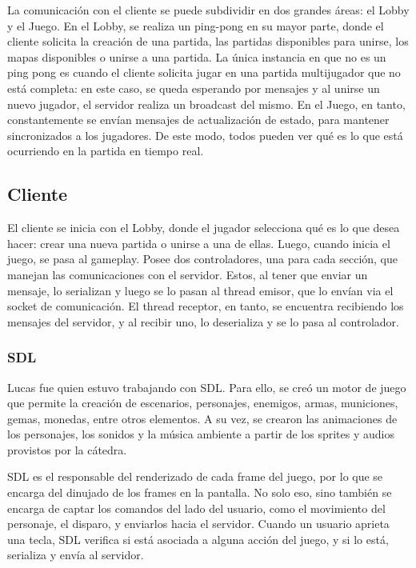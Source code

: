 \documentclass[titlepage,a4paper]{article}
\begin{document}
La comunicación con el cliente se puede subdividir en dos grandes áreas: el Lobby y el Juego. En el Lobby, se realiza un ping-pong en su mayor parte, donde el cliente solicita la creación de una partida, las partidas disponibles para unirse, los mapas disponibles o unirse a una partida. La única instancia en que no es un ping pong es cuando el cliente solicita jugar en una partida multijugador que no está completa: en este caso, se queda esperando por mensajes y al unirse un nuevo jugador, el servidor realiza un broadcast del mismo. En el Juego, en tanto, constantemente se envían mensajes de actualización de estado, para mantener sincronizados a los jugadores. De este modo, todos pueden ver qué es lo que está ocurriendo en la partida en tiempo real.

\subsection{Cliente}
El cliente se inicia con el Lobby, donde el jugador selecciona qué es lo que desea hacer: crear una nueva partida o unirse a una de ellas. Luego, cuando inicia el juego, se pasa al gameplay. Posee dos controladores, una para cada sección, que manejan las comunicaciones con el servidor. Estos, al tener que enviar un mensaje, lo serializan y luego se lo pasan al thread emisor, que lo envían via el socket de comunicación. El thread receptor, en tanto, se encuentra recibiendo los mensajes del servidor, y al recibir uno, lo deserializa y se lo pasa al controlador.

\subsubsection{SDL}
Lucas fue quien estuvo trabajando con SDL. Para ello, se creó un motor de juego que permite la creación de escenarios, personajes, enemigos, armas, municiones, gemas, monedas, entre otros elementos. A su vez, se crearon las animaciones de los personajes, los sonidos y la música ambiente a partir de los sprites y audios provistos por la cátedra. 

SDL es el responsable del renderizado de cada frame del juego, por lo que se encarga del dinujado de los frames en la pantalla. No solo eso, sino también se encarga de captar los comandos del lado del usuario, como el movimiento del personaje, el disparo, y enviarlos hacia el servidor. Cuando un usuario aprieta una tecla, SDL verifica si está asociada a alguna acción del juego, y si lo está, serializa y envía al servidor.
\end{document}
